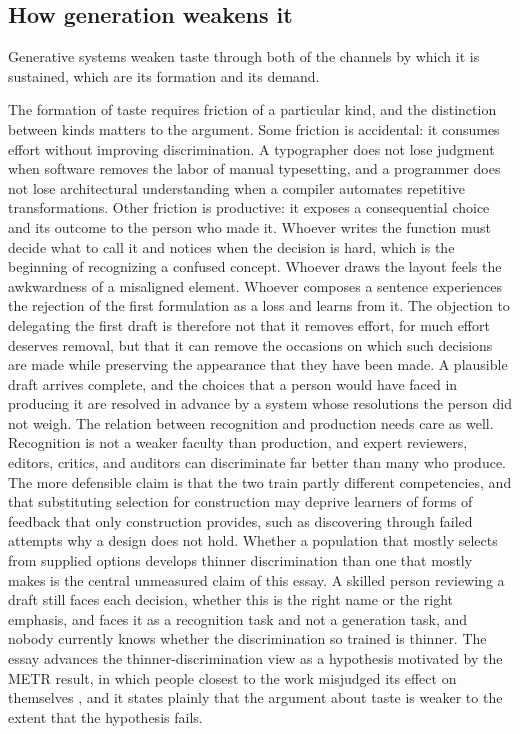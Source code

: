 \documentclass[11pt,a4paper]{article}
\theoremstyle{remark}
\begin{document}
\subsection{How generation weakens it}

Generative systems weaken taste through both of the channels by which it is sustained, which are its formation and its demand.

The formation of taste requires friction of a particular kind, and the distinction between kinds matters to the argument. Some friction is accidental: it consumes effort without improving discrimination. A typographer does not lose judgment when software removes the labor of manual typesetting, and a programmer does not lose architectural understanding when a compiler automates repetitive transformations. Other friction is productive: it exposes a consequential choice and its outcome to the person who made it. Whoever writes the function must decide what to call it and notices when the decision is hard, which is the beginning of recognizing a confused concept. Whoever draws the layout feels the awkwardness of a misaligned element. Whoever composes a sentence experiences the rejection of the first formulation as a loss and learns from it. The objection to delegating the first draft is therefore not that it removes effort, for much effort deserves removal, but that it can remove the occasions on which such decisions are made while preserving the appearance that they have been made. A plausible draft arrives complete, and the choices that a person would have faced in producing it are resolved in advance by a system whose resolutions the person did not weigh. The relation between recognition and production needs care as well. Recognition is not a weaker faculty than production, and expert reviewers, editors, critics, and auditors can discriminate far better than many who produce. The more defensible claim is that the two train partly different competencies, and that substituting selection for construction may deprive learners of forms of feedback that only construction provides, such as discovering through failed attempts why a design does not hold. Whether a population that mostly selects from supplied options develops thinner discrimination than one that mostly makes is the central unmeasured claim of this essay. A skilled person reviewing a draft still faces each decision, whether this is the right name or the right emphasis, and faces it as a recognition task and not a generation task, and nobody currently knows whether the discrimination so trained is thinner. The essay advances the thinner-discrimination view as a hypothesis motivated by the METR result, in which people closest to the work misjudged its effect on themselves \cite{METR2025}, and it states plainly that the argument about taste is weaker to the extent that the hypothesis fails.
\end{document}
